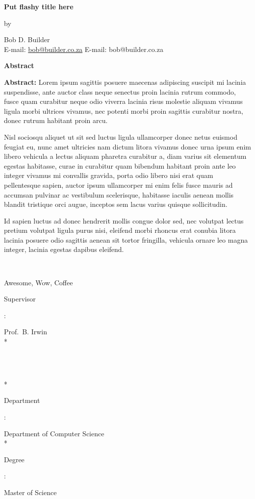 \begin{center}
	{\large\bf Put flashy title here}
\end{center}
\begin{center}by\end{center}
\begin{center}
	{Bob D. Builder}\\
	\ifpdf
		E-mail: \href{mailto:bob@builder.co.za}{bob@builder.co.za}
	\else
		E-mail: bob@builder.co.za
	\fi
\end{center}
\vspace{1cm}
\begin{center}{\large\bf Abstract}\end{center}

\textbf{Abstract:} Lorem ipsum sagittis posuere maecenas adipiscing suscipit mi lacinia suspendisse, ante auctor class neque senectus proin lacinia rutrum commodo, fusce quam curabitur neque odio viverra lacinia risus molestie aliquam vivamus ligula morbi ultrices vivamus, nec potenti morbi proin sagittis curabitur nostra, donec rutrum habitant proin arcu.

Nisl sociosqu aliquet ut sit sed luctus ligula ullamcorper donec netus euismod feugiat eu, nunc amet ultricies nam dictum litora vivamus donec urna ipsum enim libero vehicula a lectus aliquam pharetra curabitur a, diam varius sit elementum egestas habitasse, curae in curabitur quam bibendum habitant proin ante leo integer vivamus mi convallis gravida, porta odio libero nisi erat quam pellentesque sapien, auctor ipsum ullamcorper mi enim felis fusce mauris ad accumsan pulvinar ac vestibulum scelerisque, habitasse iaculis aenean mollis blandit tristique orci augue, inceptos sem lacus varius quisque sollicitudin.

Id sapien luctus ad donec hendrerit mollis congue dolor sed, nec volutpat lectus pretium volutpat ligula purus nisi, eleifend morbi rhoncus erat conubia litora lacinia posuere odio sagittis aenean sit tortor fringilla, vehicula ornare leo magna integer, lacinia egestas dapibus eleifend.

\noindent\

 Awesome, Wow, Coffee

\vfill
\noindent
{\bf\parbox{26.8mm}{Supervisor}:} Prof.~B. Irwin \\* %
{\bf\parbox{28.55mm}{~}} \\*
{\bf\parbox{26.8mm}{Department}:} Department of Computer Science \\*
{\bf\parbox{26.8mm}{Degree}:} Master of Science

